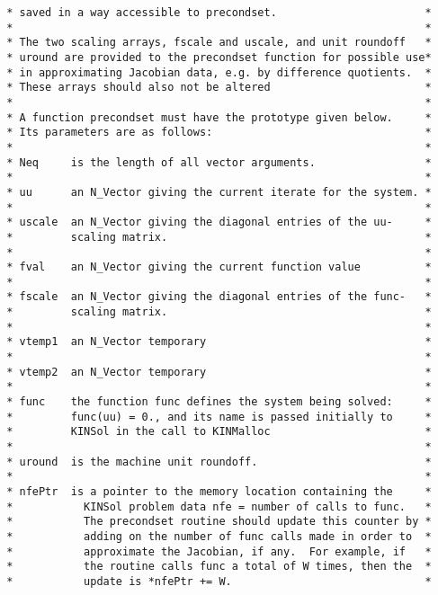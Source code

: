 \documentclass[11pt]{article}
\begin{document}
\begin{verbatim}
 * saved in a way accessible to precondset.                       *
 *                                                                *
 * The two scaling arrays, fscale and uscale, and unit roundoff   *
 * uround are provided to the precondset function for possible use*
 * in approximating Jacobian data, e.g. by difference quotients.  *
 * These arrays should also not be altered                        *
 *                                                                *
 * A function precondset must have the prototype given below.     *
 * Its parameters are as follows:                                 *
 *                                                                *
 * Neq     is the length of all vector arguments.                 *
 *                                                                *
 * uu      an N_Vector giving the current iterate for the system. *
 *                                                                *
 * uscale  an N_Vector giving the diagonal entries of the uu-     *
 *         scaling matrix.                                        *
 *                                                                *
 * fval    an N_Vector giving the current function value          *
 *                                                                *
 * fscale  an N_Vector giving the diagonal entries of the func-   *
 *         scaling matrix.                                        *
 *                                                                *
 * vtemp1  an N_Vector temporary                                  *
 *                                                                *
 * vtemp2  an N_Vector temporary                                  *
 *                                                                *
 * func    the function func defines the system being solved:     *
 *         func(uu) = 0., and its name is passed initially to     *
 *         KINSol in the call to KINMalloc                        *
 *                                                                *
 * uround  is the machine unit roundoff.                          *
 *                                                                *
 * nfePtr  is a pointer to the memory location containing the     *
 *           KINSol problem data nfe = number of calls to func.   *
 *           The precondset routine should update this counter by *
 *           adding on the number of func calls made in order to  *
 *           approximate the Jacobian, if any.  For example, if   *
 *           the routine calls func a total of W times, then the  *
 *           update is *nfePtr += W.                              *

\end{verbatim}
\end{document}

